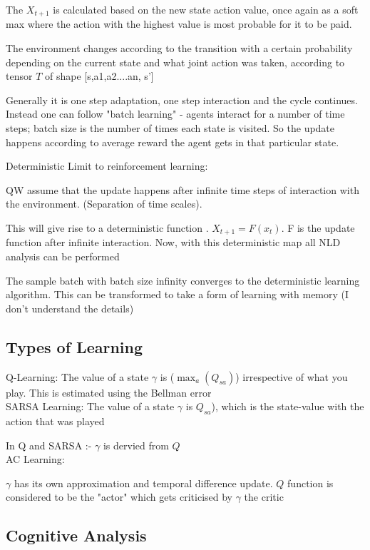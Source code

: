 The $X_{t+1}$ is calculated based on the new state action value, once again as a soft max where the action with the highest value is most probable for it to be paid. 

The environment changes according to the transition with a certain probability depending on the current state and what joint action was taken, according to tensor $T$ of shape [s,a1,a2....an, s']

Generally it is one step adaptation, one step interaction and the cycle continues. Instead one can follow "batch learning" - agents interact for a number of time steps; batch size is the number of times each state is visited. So the update happens according to average reward the agent gets in that particular state.

Deterministic Limit to reinforcement learning:  

QW assume that the update happens after infinite time steps of interaction with the environment. (Separation of time scales).

This will give rise to a deterministic function . $X_{t+1} = F(x_t)$. F is the update function after infinite interaction.  Now, with this deterministic map all NLD analysis can be performed

The sample batch with batch size infinity converges to the deterministic learning algorithm. This can be transformed to take a form of learning with memory (I don't understand the details)


\subsection{Types of Learning}

Q-Learning: The value of a state $\gamma$ is ($\max_a(Q_{sa})$)
irrespective of what you play. This is estimated using the Bellman error\\

SARSA Learning:  The value of a state $\gamma$  is  $Q_{sa}$), which is the state-value with the action that was played

In Q and SARSA :- $\gamma$ is dervied from $Q$
\\
AC Learning: 

$\gamma$ has its own approximation and temporal difference update. $Q$ function is considered to be the "actor" which gets criticised by $\gamma$ the critic


\subsection{Cognitive Analysis}

